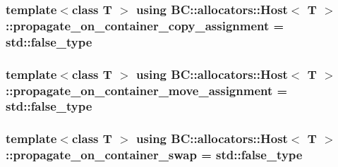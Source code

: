 \subsubsection[{\texorpdfstring{propagate\+\_\+on\+\_\+container\+\_\+copy\+\_\+assignment}{propagate_on_container_copy_assignment}}]{\setlength{\rightskip}{0pt plus 5cm}template$<$class T $>$ using {\bf B\+C\+::allocators\+::\+Host}$<$ T $>$\+::{\bf propagate\+\_\+on\+\_\+container\+\_\+copy\+\_\+assignment} =  std\+::false\+\_\+type}\hypertarget{structBC_1_1allocators_1_1Host_abb579317e977037f39958b3fa43b92c7}{}\label{structBC_1_1allocators_1_1Host_abb579317e977037f39958b3fa43b92c7}
\subsubsection[{\texorpdfstring{propagate\+\_\+on\+\_\+container\+\_\+move\+\_\+assignment}{propagate_on_container_move_assignment}}]{\setlength{\rightskip}{0pt plus 5cm}template$<$class T $>$ using {\bf B\+C\+::allocators\+::\+Host}$<$ T $>$\+::{\bf propagate\+\_\+on\+\_\+container\+\_\+move\+\_\+assignment} =  std\+::false\+\_\+type}\hypertarget{structBC_1_1allocators_1_1Host_a965a8964fd4ec1851d3bec468a51d07d}{}\label{structBC_1_1allocators_1_1Host_a965a8964fd4ec1851d3bec468a51d07d}
\subsubsection[{\texorpdfstring{propagate\+\_\+on\+\_\+container\+\_\+swap}{propagate_on_container_swap}}]{\setlength{\rightskip}{0pt plus 5cm}template$<$class T $>$ using {\bf B\+C\+::allocators\+::\+Host}$<$ T $>$\+::{\bf propagate\+\_\+on\+\_\+container\+\_\+swap} =  std\+::false\+\_\+type}\hypertarget{structBC_1_1allocators_1_1Host_a8ff9ef7cce3b0ffc4051c930c358512b}{}\label{structBC_1_1allocators_1_1Host_a8ff9ef7cce3b0ffc4051c930c358512b}
